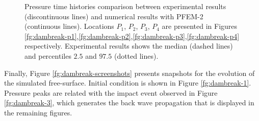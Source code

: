 \begin{figure}[h]
{    }
   \caption{Pressure time histories comparison between experimental results\cite{Lobovsky13} (discontinuous lines) and numerical results with PFEM-2 (continuous lines). Locations $P_1$, $P_2$, $P_3$, $P_4$ are presented in Figures \ref{fg:dambreak-p1},\ref{fg:dambreak-p2},\ref{fg:dambreak-p3},\ref{fg:dambreak-p4} respectively. Experimental results shows the median (dashed lines) and percentiles $2.5$ and $97.5$ (dotted lines).}
   \label{fg:dambreak-p}                %
\end{figure}

Finally, Figure \ref{fg:dambreak-screenshots} presents snapshots for the evolution of the simulated free-surface. Initial condition is shown in Figure \ref{fg:dambreak-1}. Pressure peaks are related with the impact event observed in Figure \ref{fg:dambreak-3}, which generates the back wave propagation that is displayed in the remaining figures.
